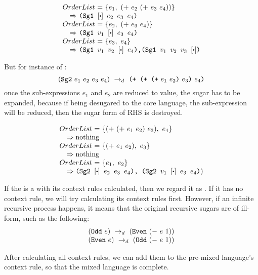\begin{footnotesize}
\[
\begin{array}{l}
\mbox{$OrderList$ = $\{e_1,~(+~e_2~(+~e_3~e_4))\}$} \\
\quad \mbox{$\Rightarrow$ \Code{(Sg1 $[\bigcdot]~e_2~e_3~e_4$)}}\\
\mbox{$OrderList$ = $\{e_2,~(+~e_3~e_4)\}$}\\
\quad \mbox{$\Rightarrow$ \Code{(Sg1 $v_1~[\bigcdot]~e_3~e_4$)}}\\
\mbox{$OrderList$ = $\{e_3,~e_4\}$} \\
\quad \mbox{$\Rightarrow$ \Code{(Sg1 $v_1~v_2~[\bigcdot]~e_4$),(Sg1 $v_1~v_2~v_3~[\bigcdot]$)}}
\end{array}
\]
\end{footnotesize}
But for instance of :
\[
(\mbox{\tt Sg2}~e_1~e_2~e_3~e_4) ~\rightarrow_d~ \mbox{\tt (+~(+~(+}~e_1~e_2\mbox{\tt )}~e_3\mbox{\tt )}~e_4\mbox{\tt )}
\]
once the sub-expressions $e_1$ and $e_2$ are reduced to value, the sugar has to be expanded, because if being desugared to the core language, the sub-expression  will be reduced, then the sugar form of RHS is destroyed. 
\begin{footnotesize}
	

	\[
\begin{array}{l}
\mbox{$OrderList$ = $\{(+~(+~e_1~e_2)~e_3),~e_4\}$}\\
\quad \Rightarrow \mbox{nothing}\\
\mbox{$OrderList$ = $\{(+~e_1~e_2),~e_3\}$}\\
\quad \Rightarrow \mbox{nothing}\\
\mbox{$OrderList$ = $\{e_1,~e_2\}$}\\
\quad \Rightarrow \mbox{\Code{(Sg2 $[\bigcdot]~e_2~e_3~e_4$), (Sg2 $v_1~[\bigcdot]~e_3~e_4$)})}
\end{array}
\]
\end{footnotesize}


If the  is a  with its context rules calculated, then we regard it as . If it has no context rule, we will try calculating its context rules first. However, if an infinite recursive process happens, it means that the original recursive sugars are of ill-form, such as the following:
\[
\begin{array}{l}
(\mbox{\tt Odd}~e) ~\rightarrow_d~ (\mbox{\tt Even}~(-~e~1))\\
(\mbox{\tt Even}~e) ~\rightarrow_d~ (\mbox{\tt Odd}~(-~e~1))
\end{array}
\]

After calculating all context rules, we can add them to the pre-mixed language's context rule, so that the mixed language is complete.

